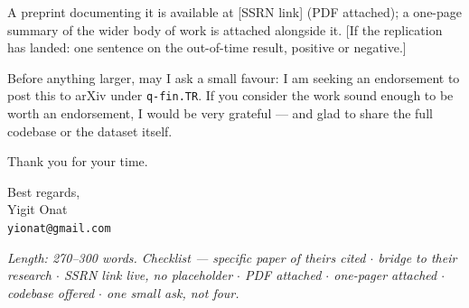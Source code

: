 \documentclass[11pt,a4paper]{article}
\begin{document}
\medskip

A preprint documenting it is available at [SSRN link] (PDF attached); a one-page summary of the wider body of work is attached alongside it. [If the replication has landed: one sentence on the out-of-time result, positive or negative.]

\medskip

Before anything larger, may I ask a small favour: I am seeking an endorsement to post this to arXiv under \texttt{q-fin.TR}. If you consider the work sound enough to be worth an endorsement, I would be very grateful --- and glad to share the full codebase or the dataset itself.

\medskip

\noindent Thank you for your time.

\medskip

\noindent Best regards,\\
Yigit Onat\\
\texttt{yionat@gmail.com}

\bigskip

\noindent\textit{Length: 270--300 words. Checklist --- specific paper of theirs cited $\cdot$ bridge to
their research $\cdot$ SSRN link live, no placeholder $\cdot$ PDF attached $\cdot$ one-pager attached
$\cdot$ codebase offered $\cdot$ one small ask, not four.}
\end{document}
